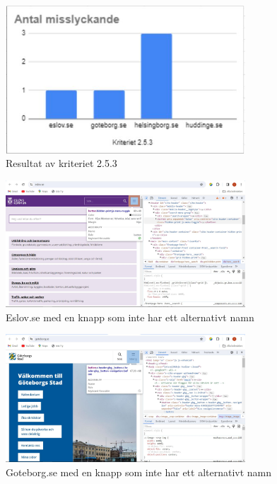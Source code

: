 \documentclass[11p]{article}
\begin{document}
    \begin{figure}[hbt!]
        \includegraphics[width=0.8\textwidth]{../images/resultat253.jpg}
        \caption{ Resultat av kriteriet 2.5.3 }
    \end{figure}

    \begin{figure}[hbt!]
        \includegraphics[width=0.8\textwidth]{../images/Eslov253.jpg}
        \caption{ Eslov.se med en knapp som inte har ett alternativt namn }
    \end{figure}

    \begin{figure}[hbt!]
        \includegraphics[width=0.8\textwidth]{../images/Goteborg253.jpg}
        \caption{ Goteborg.se med en knapp som inte har ett alternativt namn }
    \end{figure}
\end{document}
